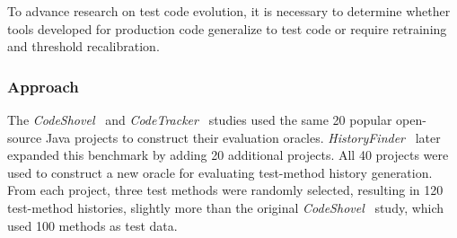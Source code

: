 %

To advance research on test code evolution, it is necessary to determine whether tools developed for production code generalize to test code or require retraining and threshold recalibration.
\subsubsection{Approach}
The \emph{CodeShovel}~\cite{grund:2021} and \emph{CodeTracker}~\cite{jodavi_accurate_2022} studies used the same 20 popular open-source Java projects to construct their evaluation oracles. \emph{HistoryFinder}~\cite{islam_historyfinder_2025} later expanded this benchmark by adding 20 additional projects. All 40 projects were used to construct a new oracle for evaluating test-method history generation. From each project, three test methods were randomly selected, resulting in 120 test-method histories, slightly more than the original \emph{CodeShovel}~\cite{grund:2021} study, which used 100 methods as test data.

